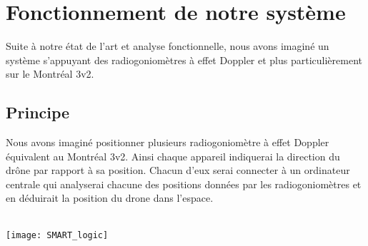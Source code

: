 
\chapter{Fonctionnement de notre système}
\label{chap:fonctionnement}

Suite à notre état de l'art et analyse fonctionnelle, nous avons imaginé un système s'appuyant des radiogoniomètres à effet Doppler et plus particulièrement sur le Montréal 3v2.


\section{Principe}

Nous avons imaginé positionner plusieurs radiogoniomètre à effet Doppler équivalent au Montréal 3v2. Ainsi chaque appareil indiquerai la direction du drône par rapport à sa position. Chacun d'eux serai connecter à un ordinateur centrale qui analyserai chacune des positions données par les radiogoniomètres et en déduirait la position du drone dans l'espace.

~\\

\texttt{[image: SMART\_logic]}







